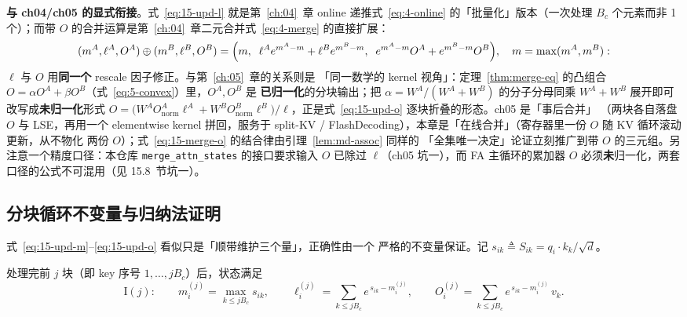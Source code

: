 \textbf{与 ch04/ch05 的显式衔接}。式~\ref{eq:15-upd-l} 就是第~\ref{ch:04}~章 online
递推式~\ref{eq:4-online} 的「批量化」版本（一次处理 $B_c$ 个元素而非 1 个）；而带 $O$
的合并运算是第~\ref{ch:04}~章二元合并式~\ref{eq:4-merge} 的直接扩展：
\begin{equation}
  (m^{A}, \ell^{A}, O^{A}) \oplus (m^{B}, \ell^{B}, O^{B}) =
  \Bigl(m,\;\; \ell^{A} e^{m^{A}-m} + \ell^{B} e^{m^{B}-m},\;\;
  e^{m^{A}-m} O^{A} + e^{m^{B}-m} O^{B}\Bigr),
  \quad m = \max(m^{A}, m^{B}) :
  \label{eq:15-merge-o}
\end{equation}
$\ell$ 与 $O$ 用\textbf{同一个} rescale 因子修正。与第~\ref{ch:05}~章的关系则是
「同一数学的 kernel 视角」：定理~\ref{thm:merge-eq} 的凸组合
$O = \alpha O^{A} + \beta O^{B}$（式~\ref{eq:5-convex}）里，$O^{A}, O^{B}$ 是
\textbf{已归一化}的分块输出；把 $\alpha = W^{A}/(W^{A}{+}W^{B})$ 的分子分母同乘
$W^{A}{+}W^{B}$ 展开即可改写成\textbf{未归一化}形式
$O = \bigl(W^{A} O^{A}_{\text{norm}}\ell^{A} + W^{B} O^{B}_{\text{norm}}\ell^{B}
\bigr)/\ell$，正是式~\ref{eq:15-upd-o} 逐块折叠的形态。ch05 是「事后合并」
（两块各自落盘 $O$ 与 LSE，再用一个 elementwise kernel 拼回，服务于 split-KV /
FlashDecoding），本章是「在线合并」（寄存器里一份 $O$ 随 KV 循环滚动更新，从不物化
两份 $O$）；式~\ref{eq:15-merge-o} 的结合律由引理~\ref{lem:md-assoc} 同样的
「全集唯一决定」论证立刻推广到带 $O$ 的三元组。另注意一个精度口径：本仓库
\texttt{merge\_\allowbreak{}attn\_\allowbreak{}states} 的接口要求输入 $O$ 已除过 $\ell$（ch05 坑一），而 FA
主循环的累加器 $O$ 必须\textbf{未}归一化，两套口径的公式不可混用（见 15.8~节坑一）。

\subsection{分块循环不变量与归纳法证明}

式~\ref{eq:15-upd-m}--\ref{eq:15-upd-o} 看似只是「顺带维护三个量」，正确性由一个
严格的不变量保证。记 $s_{ik} \triangleq S_{ik} = q_i \cdot k_k/\sqrt{d}$。

\begin{definition}[分块循环不变量]\label{def:15-inv}
  处理完前 $j$ 块（即 key 序号 $1, \dots, jB_c$）后，状态满足
  \begin{equation}
    \mathrm{I}(j):\qquad
    m^{(j)}_i = \max_{k \le jB_c} s_{ik}, \qquad
    \ell^{(j)}_i = \sum_{k \le jB_c} e^{\,s_{ik} - m^{(j)}_i}, \qquad
    O^{(j)}_i = \sum_{k \le jB_c} e^{\,s_{ik} - m^{(j)}_i}\, v_k .
    \label{eq:15-invariant}
  \end{equation}
\end{definition}

